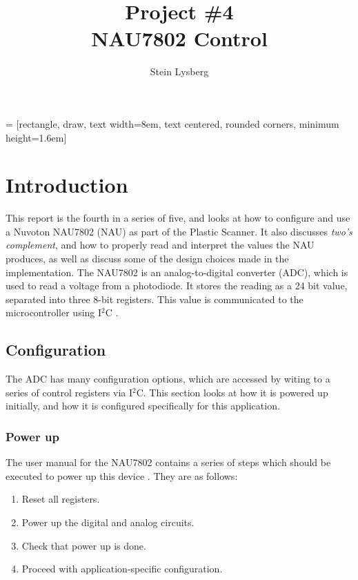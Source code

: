 \documentclass[12pt, a4paper]{article}
\title{
    Project \#4\\
    \large NAU7802 Control\\
}
\author{
    Stein Lysberg
}
\begin{document}
 = [rectangle, draw, text width=8em, text centered, rounded      corners, minimum height=1.6em]


    \maketitle
    \tableofcontents
    \thispagestyle{empty}
    \addtocounter{page}{-1}
    \clearpage


    \section{Introduction}

        This report is the fourth in a series of five, and looks at how to configure and use a Nuvoton NAU7802 (NAU) as part of
        the Plastic Scanner. It also discusses \textit{two's complement}, and how to properly read and interpret the values the NAU 
        produces, as well as discuss some of the design choices made in the implementation. The NAU7802 is an analog-to-digital converter (ADC),
        which is used to read a voltage from a photodiode. It stores the reading as a 24 bit value, separated into
        three 8-bit registers. This value is communicated to the microcontroller using I$^2$C \cite{nau}.

        \subsection{Configuration}

            The ADC has many configuration options, which are accessed by witing to a
            series of control registers via I$^2$C. This section looks at how it is powered up initially,
            and how it is configured specifically for this application.

            \subsubsection{Power up}
                The user manual for the NAU7802 contains a series of steps which should be executed to power up this device \cite{nau}. They are as follows:
                \begin{enumerate}
                    \item Reset all registers.
                    \item Power up the digital and analog circuits.
                    \item Check that power up is done.
                    \item Proceed with application-specific configuration.
                \end{enumerate}
\end{document}
